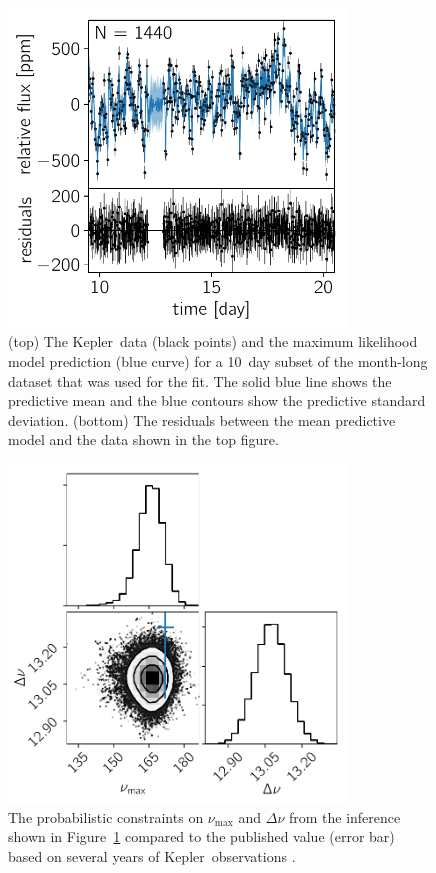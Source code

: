 \documentclass[manuscript, letterpaper]{aastex6}
\newcommand{\project}[1]{\textsf{#1}}
\newcommand{\kepler}{\project{Kepler}}
\newcommand{\figureref}[1]{\ref{fig:#1}}
\newcommand{\Figure}[1]{Figure~\figureref{#1}}
\newcommand{\figurelabel}[1]{\label{fig:#1}}
\newcommand{\response}[1]{{\color{blue}#1}}
\begin{document}


\begin{figure}[!htbp]
\begin{center}
\includegraphics[width=0.8\textwidth]{figures/astero/astero.pdf}
\caption{
\response{
(top) The \kepler\ data (black points) and the maximum likelihood model
    prediction (blue curve) for a 10~day subset of the month-long dataset that
    was used for the fit.
    The solid blue line shows the predictive mean and the blue contours show
    the predictive standard deviation.
(bottom) The residuals between the mean predictive model and the data
    shown in the top figure.
}
    \figurelabel{astero}}
\end{center}
\end{figure}

\begin{figure}[!htbp]
\begin{center}
\includegraphics[width=0.8\textwidth]{figures/astero/astero-corner.pdf}
\caption{The probabilistic constraints on $\nu_\mathrm{max}$ and $\Delta \nu$
    from the inference shown in \Figure{astero} compared to the published
    value (error bar) based on several years of \kepler\ observations
    \citep{Pinsonneault:2014}.
    \figurelabel{astero-corner}}
\end{center}
\end{figure}
\end{document}
